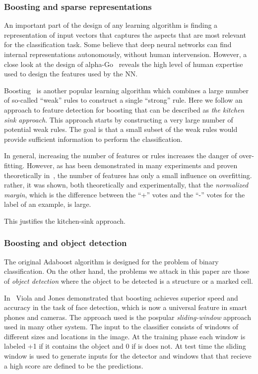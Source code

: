 \documentclass[runningheads]{llncs}
\begin{document}
\subsubsection{Boosting and sparse representations}
An important part of the design of any learning algorithm is finding a
representation of input vectors that captures the aspects that are
most relevant for the classification task. Some believe that deep
neural networks can find internal representations autonomously,
without human intervension. However, a close look at the design of
alpha-Go~\cite{silver2017mastering} reveals the high level of human
expertise used to design the features used by the NN.

Boosting~\cite{FreundSc97,schapire2013boosting} is another popular
learning algorithm which combines a large number of so-called ``weak''
rules to construct a single ``strong'' rule. Here we follow an
approach to feature detection for boosting that can be described as
{\em the kitchen sink approach}. This approach starts by constructing
a very large number of potential weak rules. The goal is that a small
subset of the weak rules would provide sufficient information to
perform the classification.

In general, increasing the number of features or rules increases the
danger of over-fitting. However, as has been demonstrated in many
experiments and proven theoretically in~\cite{SchapireFrBaLe98}, the
number of features has only a small influence on overfitting. rather,
it was shown, both theoretically and experimentally, that the {\em
  normalized margin}, which is the difference between the ``+'' votes
and the ``-'' votes for the label of an example, is large.

This justifies the kitchen-sink approach. 


\subsubsection{Boosting and object detection}
The original Adaboost algorithm is designed for the problem of binary
classification. On the other hand, the problems we attack in this
paper are those of {\em object detection} where the object to be
detected is a structure or a marked cell.

In~\cite{violajones01} Viola and Jones demonstrated that boosting
achieves superior speed and accuracy in the task of face detection,
which is now a universal feature in smart phones and cameras.  The
approach used is the pospular {\em sliding-window} approach used in
many other system.  The input to the classifier consists of windows of
different sizes and locations in the image. At the training phase each
window is labeled +1 if it contains the object and 0 if is does
not. At test time the sliding window is used to generate inputs for
the detector and windows that that recieve a high score are defined to
be the predictions.
\end{document}
